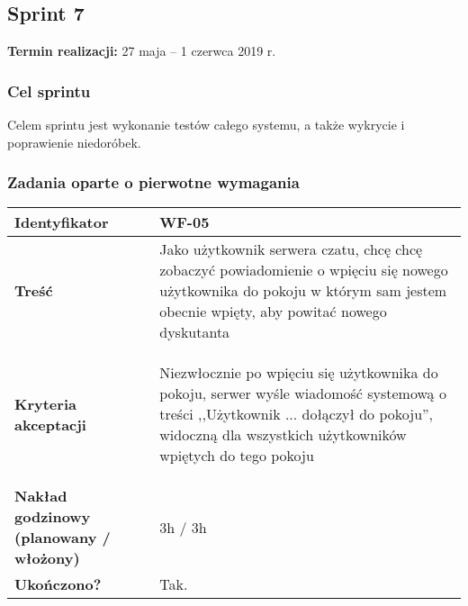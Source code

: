 \subsection{Sprint 7}

\textbf{Termin realizacji:} 27 maja -- 1 czerwca 2019 r.

\subsubsection{Cel sprintu}
Celem sprintu jest wykonanie testów całego systemu, a także wykrycie i
poprawienie niedoróbek.

\subsubsection{Zadania oparte o pierwotne wymagania}

\leavevmode\hbox{}

\begin{tabular}{ | l | l | }
	\hline
		\textbf{Identyfikator} &
		WF-05
		\\

	\hline
		\textbf{Treść} & \parbox[t]{11.5cm}{\strut
			Jako użytkownik serwera czatu, chcę chcę zobaczyć
			powiadomienie o wpięciu się nowego użytkownika do
			pokoju w którym sam jestem obecnie wpięty, aby powitać
			nowego dyskutanta
		\strut}\\

	\hline
		\parbox[t]{4cm}{\textbf{Kryteria akceptacji}} & \parbox[t]{11.5cm}{\strut
			\begin{enumreq}
				\item Niezwłocznie po wpięciu się użytkownika do
				pokoju, serwer wyśle wiadomość systemową o treści
				,,Użytkownik ... dołączył do pokoju'', widoczną
				dla wszystkich użytkowników wpiętych do tego pokoju
			\end{enumreq}
			\strut}
		\\

	\hline

  \parbox[t]{4cm}{\textbf{Nakład godzinowy (planowany / włożony)}} &
  \parbox[t]{11.5cm}{\strut
    3h / 3h
  \strut}\\

  \hline
    \parbox[t]{4cm}{\textbf{Ukończono?}} &
    \parbox[t]{11.5cm}{\strut
      Tak.
    \strut}\\
\hline
\end{tabular}

\vspace{1em}


